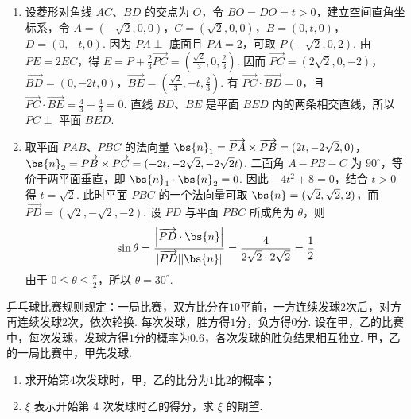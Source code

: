 \begin{solution}
\begin{enumerate}
\item 设菱形对角线 \(AC\)、\(BD\) 的交点为 \(O\)，令 \(BO=DO=t>0\)，建立空间直角坐标系，令 \(A=(-\sqrt{2},0,0)\)，\(C=(\sqrt{2},0,0)\)，\(B=(0,t,0)\)，\(D=(0,-t,0)\).
因为 \(PA\perp\) 底面且 \(PA=2\)，可取 \(P(-\sqrt{2},0,2)\). 由 \(PE=2EC\)，得
\(E=P+\frac{2}{3}\overrightarrow{PC}=\left(\frac{\sqrt{2}}{3},0,\frac{2}{3}\right)\). 因而
\(\overrightarrow{PC}=(2\sqrt{2},0,-2)\)，\(\overrightarrow{BD}=(0,-2t,0)\)，\(\overrightarrow{BE}=\left(\frac{\sqrt{2}}{3},-t,\frac{2}{3}\right)\).
有 \(\overrightarrow{PC}\cdot\overrightarrow{BD}=0\)，且
\(\overrightarrow{PC}\cdot\overrightarrow{BE}=\frac{4}{3}-\frac{4}{3}=0\). 直线 \(BD\)、\(BE\) 是平面 \(BED\) 内的两条相交直线，所以 \(PC\perp\) 平面 \(BED\).

\item 取平面 \(PAB\)、\(PBC\) 的法向量
\(\bs{n}_{1}=\overrightarrow{PA}\times\overrightarrow{PB}=(2t,-2\sqrt{2},0)\)，
\(\bs{n}_{2}=\overrightarrow{PB}\times\overrightarrow{PC}=(-2t,-2\sqrt{2},-2\sqrt{2}t)\).
二面角 \(A-PB-C\) 为 \(90^{\circ}\)，等价于两平面垂直，即 \(\bs{n}_{1}\cdot\bs{n}_{2}=0\). 因此
\(-4t^{2}+8=0\)，结合 \(t>0\) 得 \(t=\sqrt{2}\). 此时平面 \(PBC\) 的一个法向量可取 \(\bs{n}=(\sqrt{2},\sqrt{2},2)\)，而
\(\overrightarrow{PD}=(\sqrt{2},-\sqrt{2},-2)\). 设 \(PD\) 与平面 \(PBC\) 所成角为 \(\theta\)，则
\[
\sin\theta=\frac{\left\lvert\overrightarrow{PD}\cdot\bs{n}\right\rvert}{\lvert\overrightarrow{PD}\rvert\lvert\bs{n}\rvert}
 =\frac{4}{2\sqrt{2}\cdot2\sqrt{2}}=\frac{1}{2}
\]
由于 \(0\leqslant\theta\leqslant\frac{\pi}{2}\)，所以 \(\theta=30^{\circ}\).
\end{enumerate}
\end{solution}

\begin{problem}
乒乓球比赛规则规定：一局比赛，双方比分在\(10\)平前，一方连续发球\(2\)次后，对方再连续发球\(2\)次，依次轮换. 每次发球，胜方得\(1\)分，负方得\(0\)分. 设在甲，乙的比赛中，每次发球，发球方得\(1\)分的概率为\(0.6\)，各次发球的胜负结果相互独立. 甲，乙的一局比赛中，甲先发球.
\begin{enumerate}
\item 求开始第\(4\)次发球时，甲，乙的比分为\(1\)比\(2\)的概率；
\item \( \xi \) 表示开始第 4 次发球时乙的得分，求 \( \xi \) 的期望.
\end{enumerate}
\end{problem}

